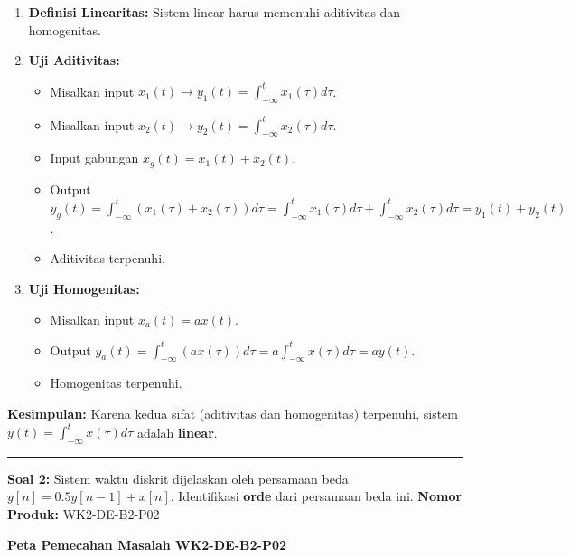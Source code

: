 \documentclass[
  letterpaper,
  DIV=11,
  numbers=noendperiod]{scrreprt}
\providecommand{\tightlist}{%
  \setlength{\itemsep}{0pt}\setlength{\parskip}{0pt}}
\begin{document}
\begin{enumerate}
\def\labelenumi{\arabic{enumi}.}
\tightlist
\item
  \textbf{Definisi Linearitas:} Sistem linear harus memenuhi aditivitas
  dan homogenitas.
\item
  \textbf{Uji Aditivitas:}

  \begin{itemize}
  \tightlist
  \item
    Misalkan input
    \(x_1(t) \rightarrow y_1(t) = \int_{-\infty}^{t} x_1(\tau) d\tau\).
  \item
    Misalkan input
    \(x_2(t) \rightarrow y_2(t) = \int_{-\infty}^{t} x_2(\tau) d\tau\).
  \item
    Input gabungan \(x_g(t) = x_1(t) + x_2(t)\).
  \item
    Output
    \(y_g(t) = \int_{-\infty}^{t} (x_1(\tau) + x_2(\tau)) d\tau = \int_{-\infty}^{t} x_1(\tau) d\tau + \int_{-\infty}^{t} x_2(\tau) d\tau = y_1(t) + y_2(t)\).
  \item
    Aditivitas terpenuhi.
  \end{itemize}
\item
  \textbf{Uji Homogenitas:}

  \begin{itemize}
  \tightlist
  \item
    Misalkan input \(x_a(t) = a x(t)\).
  \item
    Output
    \(y_a(t) = \int_{-\infty}^{t} (a x(\tau)) d\tau = a \int_{-\infty}^{t} x(\tau) d\tau = a y(t)\).
  \item
    Homogenitas terpenuhi.
  \end{itemize}
\end{enumerate}

\textbf{Kesimpulan:} Karena kedua sifat (aditivitas dan homogenitas)
terpenuhi, sistem \(y(t) = \int_{-\infty}^{t} x(\tau) d\tau\) adalah
\textbf{linear}.

\begin{center}\rule{0.5\linewidth}{0.5pt}\end{center}

\textbf{Soal 2:} Sistem waktu diskrit dijelaskan oleh persamaan beda
\(y[n] = 0.5y[n-1] + x[n]\). Identifikasi \textbf{orde} dari persamaan
beda ini. \textbf{Nomor Produk:} WK2-DE-B2-P02

\textbf{Peta Pemecahan Masalah WK2-DE-B2-P02}
\end{document}
